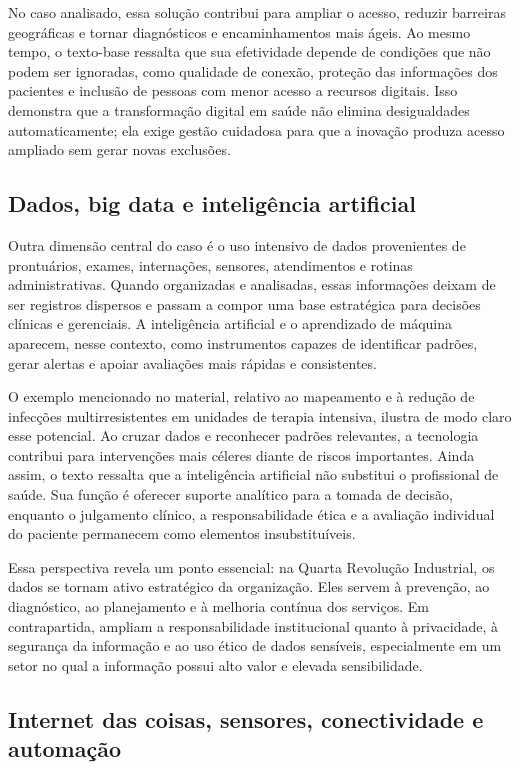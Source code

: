 \documentclass[12pt,a4paper]{article}
\begin{document}
No caso analisado, essa solução contribui para ampliar o acesso, reduzir barreiras geográficas e tornar diagnósticos e encaminhamentos mais ágeis. Ao mesmo tempo, o texto-base ressalta que sua efetividade depende de condições que não podem ser ignoradas, como qualidade de conexão, proteção das informações dos pacientes e inclusão de pessoas com menor acesso a recursos digitais. Isso demonstra que a transformação digital em saúde não elimina desigualdades automaticamente; ela exige gestão cuidadosa para que a inovação produza acesso ampliado sem gerar novas exclusões.

\subsection{Dados, big data e inteligência artificial}
\label{sec:orge62458c}

Outra dimensão central do caso é o uso intensivo de dados provenientes de prontuários, exames, internações, sensores, atendimentos e rotinas administrativas. Quando organizadas e analisadas, essas informações deixam de ser registros dispersos e passam a compor uma base estratégica para decisões clínicas e gerenciais. A inteligência artificial e o aprendizado de máquina aparecem, nesse contexto, como instrumentos capazes de identificar padrões, gerar alertas e apoiar avaliações mais rápidas e consistentes.

O exemplo mencionado no material, relativo ao mapeamento e à redução de infecções multirresistentes em unidades de terapia intensiva, ilustra de modo claro esse potencial. Ao cruzar dados e reconhecer padrões relevantes, a tecnologia contribui para intervenções mais céleres diante de riscos importantes. Ainda assim, o texto ressalta que a inteligência artificial não substitui o profissional de saúde. Sua função é oferecer suporte analítico para a tomada de decisão, enquanto o julgamento clínico, a responsabilidade ética e a avaliação individual do paciente permanecem como elementos insubstituíveis.

Essa perspectiva revela um ponto essencial: na Quarta Revolução Industrial, os dados se tornam ativo estratégico da organização. Eles servem à prevenção, ao diagnóstico, ao planejamento e à melhoria contínua dos serviços. Em contrapartida, ampliam a responsabilidade institucional quanto à privacidade, à segurança da informação e ao uso ético de dados sensíveis, especialmente em um setor no qual a informação possui alto valor e elevada sensibilidade.

\subsection{Internet das coisas, sensores, conectividade e automação}
\label{sec:org7692c12}
\end{document}
